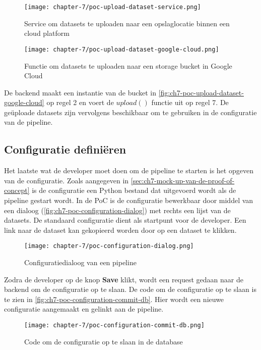 \begin{figure}[hbt!]
  \centering
  \texttt{[image: chapter-7/poc-upload-dataset-service.png]}
  \caption{Service om datasets te uploaden naar een opslaglocatie binnen een cloud platform}
  \label{fig:ch7-poc-upload-dataset-service}
\end{figure}

\begin{figure}[hbt!]
  \centering
  \texttt{[image: chapter-7/poc-upload-dataset-google-cloud.png]}
  \caption{Functie om datasets te uploaden naar een storage bucket in Google Cloud}
  \label{fig:ch7-poc-upload-dataset-google-cloud}
\end{figure}

De backend maakt een instantie van de bucket in \autoref{fig:ch7-poc-upload-dataset-google-cloud} op regel 2 en voert de \(upload()\) functie uit op regel 7. De geüploade datasets zijn vervolgens beschikbaar om te gebruiken in de configuratie van de pipeline.

\subsection{Configuratie definiëren}\label{subsec:ch7-configuratie-definieren}
Het laatste wat de developer moet doen om de pipeline te starten is het opgeven van de configuratie. Zoals aangegeven in \autoref{sec:ch7-mock-up-van-de-proof-of-concept} is de configuratie een Python bestand dat uitgevoerd wordt als de pipeline gestart wordt. In de PoC is de configuratie bewerkbaar door middel van een dialoog (\autoref{fig:ch7-poc-configuration-dialog}) met rechts een lijst van de datasets. De standaard configuratie dient als startpunt voor de developer. Een link naar de dataset kan gekopieerd worden door op een dataset te klikken.

\begin{figure}[hbt!]
  \centering
  \texttt{[image: chapter-7/poc-configuration-dialog.png]}
  \caption{Configuratiedialoog van een pipeline}
  \label{fig:ch7-poc-configuration-dialog}
\end{figure}

Zodra de developer op de knop \textbf{Save} klikt, wordt een request gedaan naar de backend om de configuratie op te slaan. De code om de configuratie op te slaan is te zien in \autoref{fig:ch7-poc-configuration-commit-db}. Hier wordt een nieuwe configuratie aangemaakt en gelinkt aan de pipeline.

\begin{figure}[hbt!]
  \centering
  \texttt{[image: chapter-7/poc-configuration-commit-db.png]}
  \caption{Code om de configuratie op te slaan in de database}
  \label{fig:ch7-poc-configuration-commit-db}
\end{figure}

